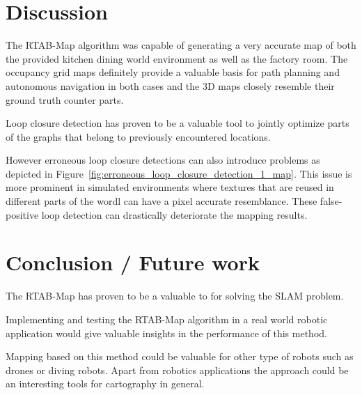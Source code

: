 \documentclass[10pt,journal,compsoc]{IEEEtran}
\begin{document}
\section{Discussion}

The RTAB-Map algorithm was capable of generating a very accurate map of both the provided kitchen dining world environment as well as the factory room.
The occupancy grid maps definitely provide a valuable basis for path planning and autonomous navigation in both cases and the 3D maps closely resemble their ground truth counter parts.

Loop closure detection has proven to be a valuable tool to jointly optimize parts of the graphs that belong to previously encountered locations.

However erroneous loop closure detections can also introduce problems as depicted in Figure~\ref{fig:erroneous_loop_closure_detection_1_map}. This issue is more prominent in simulated environments where textures that are reused in different parts of the wordl can have a pixel accurate resemblance. These false-positive loop detection can drastically deteriorate the mapping results.




\section{Conclusion / Future work}
The RTAB-Map has proven to be a valuable to for solving the SLAM problem. 

Implementing and testing the RTAB-Map algorithm in a real world robotic application would give valuable insights in the performance of this method.

Mapping based on this method could be valuable for other type of robots such as drones or diving robots. Apart from robotics applications the approach could be an interesting tools for cartography in general.




\end{document}
